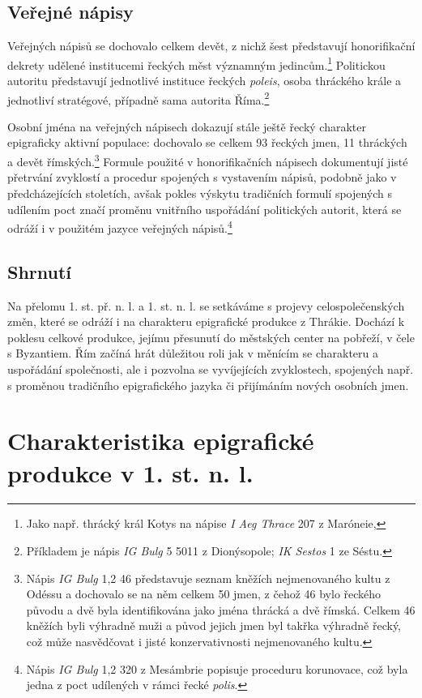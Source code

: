 \subsection[veřejné-nápisy-10]{Veřejné nápisy}

Veřejných nápisů se dochovalo celkem devět, z nichž šest představují honorifikační dekrety udělené institucemi řeckých měst významným jedincům.\footnote{Jako např. thrácký král Kotys na nápise {\em I Aeg Thrace} 207 z Maróneie,} Politickou autoritu představují jednotlivé instituce řeckých {\em poleis}, osoba thráckého krále a jednotliví stratégové, případně sama autorita Říma.\footnote{Příkladem je nápis {\em IG Bulg} 5 5011 z Dionýsopole; {\em IK Sestos} 1 ze Séstu.}

Osobní jména na veřejných nápisech dokazují stále ještě řecký charakter epigraficky aktivní populace: dochovalo se celkem 93 řeckých jmen, 11 thráckých a devět římských.\footnote{Nápis {\em IG Bulg} 1,2 46 představuje seznam kněžích nejmenovaného kultu z Odéssu a dochovalo se na něm celkem 50 jmen, z čehož 46 bylo řeckého původu a dvě byla identifikována jako jména thrácká a dvě římská. Celkem 46 kněžích byli výhradně muži a původ jejich jmen byl takřka výhradně řecký, což může nasvědčovat i jisté konzervativnosti nejmenovaného kultu.} Formule použité v honorifikačních nápisech dokumentují jisté přetrvání zvyklostí a procedur spojených s vystavením nápisů, podobně jako v předcházejících stoletích, avšak pokles výskytu tradičních formulí spojených s udílením poct značí proměnu vnitřního uspořádání politických autorit, která se odráží i v použitém jazyce veřejných nápisů.\footnote{Nápis {\em IG Bulg} 1,2 320 z Mesámbrie popisuje proceduru korunovace, což byla jedna z poct udílených v rámci řecké {\em polis}.}

\subsection[shrnutí-14]{Shrnutí}

Na přelomu 1. st. př. n. l. a 1. st. n. l. se setkáváme s projevy celospolečenských změn, které se odráží i na charakteru epigrafické produkce z Thrákie. Dochází k poklesu celkové produkce, jejímu přesunutí do městských center na pobřeží, v čele s Byzantiem. Řím začíná hrát důležitou roli jak v měnícím se charakteru a uspořádání společnosti, ale i pozvolna se vyvíjejících zvyklostech, spojených např. s proměnou tradičního epigrafického jazyka či přijímáním nových osobních jmen.

\section[charakteristika-epigrafické-produkce-v-1.-st.-n.-l.]{Charakteristika epigrafické produkce v 1. st. n. l.}

